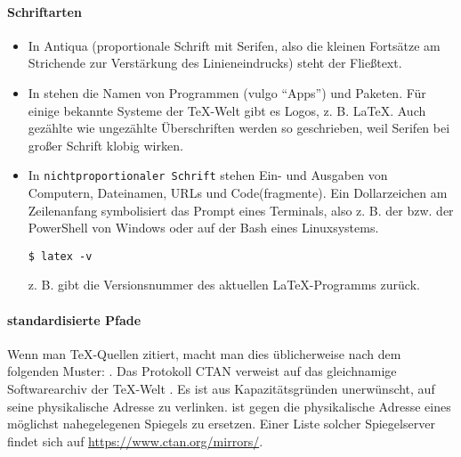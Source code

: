 \documentclass[12pt]{scrreprt}
\begin{document}
\paragraph{Schriftarten}
\begin{itemize}
\item In Antiqua (proportionale Schrift mit Serifen, also die kleinen Fortsätze am Strichende zur Verstärkung des Linieneindrucks) steht der Fließtext.
\item In  stehen die Namen von Programmen (vulgo \enquote{Apps}) und Paketen. Für einige bekannte Systeme der \TeX-Welt gibt es Logos, z. B. \LaTeX. Auch gezählte wie ungezählte Überschriften werden so geschrieben, weil Serifen bei großer Schrift klobig wirken.
\item In \texttt{nichtproportionaler Schrift} stehen Ein- und Ausgaben von Computern, Dateinamen, URLs und Code(fragmente). Ein Dollarzeichen am Zeilenanfang symbolisiert das Prompt eines Terminals, also z. B.  der  bzw.  der PowerShell von Windows oder  auf der Bash eines Linuxsystems.
\begin{Verbatim}
$ latex -v
\end{Verbatim}
z. B. gibt die Versionsnummer des aktuellen \LaTeX-Programms zurück.
\end{itemize}

\paragraph{standardisierte Pfade}
Wenn man \TeX-Quellen zitiert, macht man dies üblicherweise nach dem folgenden Muster: . Das Protokoll CTAN verweist auf das gleichnamige Softwarearchiv der \TeX-Welt . Es ist aus Kapazitätsgründen unerwünscht, auf seine physikalische Adresse zu verlinken.  ist gegen die physikalische Adresse eines möglichst nahegelegenen Spiegels zu ersetzen. Einer Liste solcher Spiegelserver findet sich auf \url{https://www.ctan.org/mirrors/}.
\end{document}
